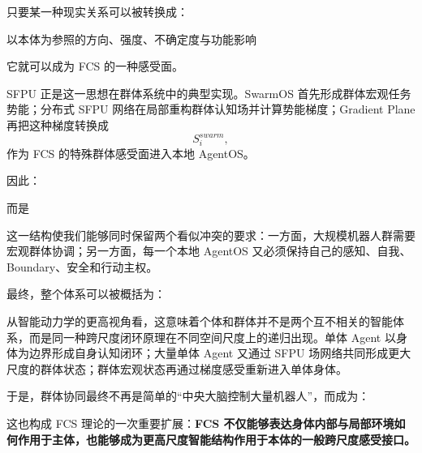 只要某一种现实关系可以被转换成：
\begin{statementbox}
以本体为参照的方向、强度、不确定度与功能影响
\end{statementbox}
它就可以成为 FCS 的一种感受面。

SFPU 正是这一思想在群体系统中的典型实现。SwarmOS 首先形成群体宏观任务势能；分布式 SFPU 网络在局部重构群体认知场并计算势能梯度；Gradient Plane 再把这种梯度转换成
\[
S_i^{swarm},
\]
作为 FCS 的特殊群体感受面进入本地 AgentOS。

因此：
\begin{statementbox}
\centering
{}
\end{statementbox}
而是
\begin{statementbox}
\centering
{}
\end{statementbox}

这一结构使我们能够同时保留两个看似冲突的要求：一方面，大规模机器人群需要宏观群体协调；另一方面，每一个本地 AgentOS 又必须保持自己的感知、自我、Boundary、安全和行动主权。

最终，整个体系可以被概括为：
\begin{statementbox}
\centering
{}
\end{statementbox}

从智能动力学的更高视角看，这意味着个体和群体并不是两个互不相关的智能体系，而是同一种跨尺度闭环原理在不同空间尺度上的递归出现。单体 Agent 以身体为边界形成自身认知闭环；大量单体 Agent 又通过 SFPU 场网络共同形成更大尺度的群体状态；群体宏观状态再通过梯度感受重新进入单体身体。

于是，群体协同最终不再是简单的“中央大脑控制大量机器人”，而成为：
\begin{statementbox}
\centering
{}
\end{statementbox}

这也构成 FCS 理论的一次重要扩展：\textbf{FCS 不仅能够表达身体内部与局部环境如何作用于主体，也能够成为更高尺度智能结构作用于本体的一般跨尺度感受接口。}
